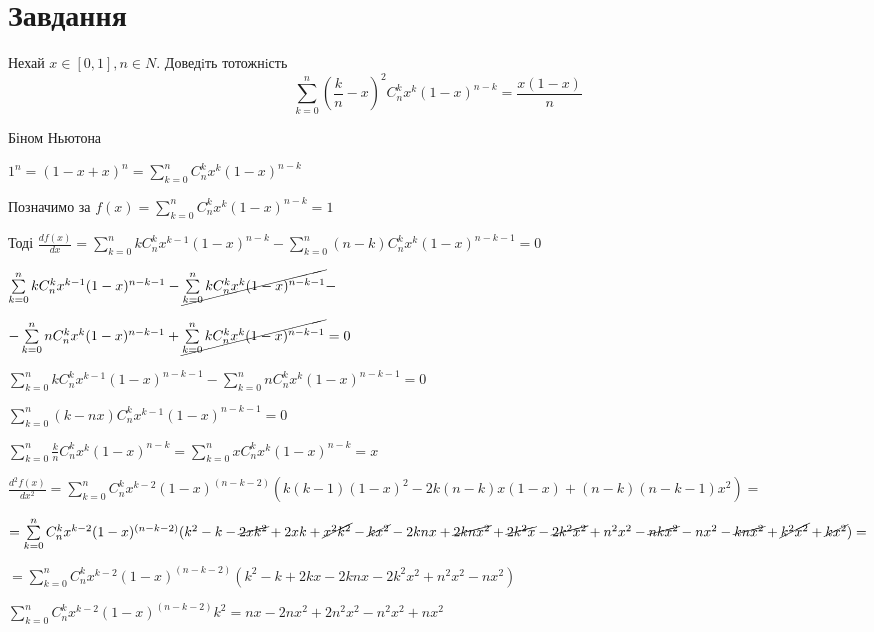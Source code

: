
\chapter{Завдання \theHchapter}

\begin{tcolorbox}[title=Завдання]
    Нехай $x \in [0, 1], n \in N$. Доведiть тотожнiсть
    $$ \sum\limits_{k=0}^{n}(\frac{k}{n} - x)^2 C_n^kx^k(1-x)^{n-k}=
    \frac{x(1-x)}{n} $$
\end{tcolorbox}



Біном Ньютона


$ 1^n = (1 - x + x)^n = \sum\limits_{k=0}^{n}C_n^kx^k(1 - x)^{n - k} $


Позначимо за $f(x) = \sum\limits_{k=0}^{n}C_n^kx^k(1 - x)^{n - k} = 1$


Тоді $\frac{df(x)}{dx} = 
\sum\limits_{k=0}^{n}kC_n^kx^{k-1}(1 - x)^{n - k} - 
\sum\limits_{k=0}^{n}(n - k)C_n^kx^k(1 - x)^{n - k - 1} = 0$


$ 
\sum\limits_{k=0}^{n}kC_n^kx^{k-1}(1 - x)^{n - k - 1} -
\cancel{\sum\limits_{k=0}^{n}kC_n^kx^{k}(1 - x)^{n - k - 1}} -$


$-\sum\limits_{k=0}^{n}nC_n^kx^k(1 - x)^{n - k - 1} + 
\cancel{\sum\limits_{k=0}^{n}kC_n^kx^k(1 - x)^{n - k - 1}} = 0$


$
\sum\limits_{k=0}^{n}kC_n^kx^{k-1}(1 - x)^{n - k - 1} -
\sum\limits_{k=0}^{n}nC_n^kx^k(1 - x)^{n - k - 1} = 0$ 


$\sum\limits_{k=0}^{n}(k - nx)C_n^kx^{k-1}(1 - x)^{n - k - 1} = 0  $



$\sum\limits_{k=0}^{n}\frac{k}{n}
C_n^kx^{k}(1 - x)^{n - k} =  
\sum\limits_{k=0}^{n}x
C_n^kx^{k}(1 - x)^{n - k} =
x$


\newpage
$\frac{d^2f(x)}{dx^2} = 
\sum\limits_{k=0}^{n}C_n^kx^{k - 2}(1 - x)^{(n - k -2)}(
    k(k - 1)(1 - x)^2 - 2 k (n - k) x (1 - x) +
    (n - k)(n - k - 1) x^2)=$


$
=\sum\limits_{k=0}^{n}C_n^kx^{k - 2}(1 - x)^{(n - k -2)}(
    k^2 - k - \cancel{2xk^2} + 2xk + \cancel{x^2k^2} - \cancel{kx^2} -
    2knx + \cancel{2knx^2} + \cancel{2k^2x} - \cancel{2k^2x^2} +
    n^2x^2 - \cancel{nkx^2} - nx^2 - \cancel{knx^2} + 
    \cancel{k^2x^2} + \cancel{kx^2}
)=
$


$
=\sum\limits_{k=0}^{n}C_n^kx^{k - 2}(1 - x)^{(n - k -2)}(
    k^2 - k + 2kx - 2knx - 2 k^2 x^2 + n^2x^2 - nx^2
)
$


$
\sum\limits_{k=0}^{n}C_n^kx^{k - 2}(1 - x)^{(n - k -2)}k^2=
nx -2nx^2 +2 n^2x^2 - n^2x^2 + nx^2
$



